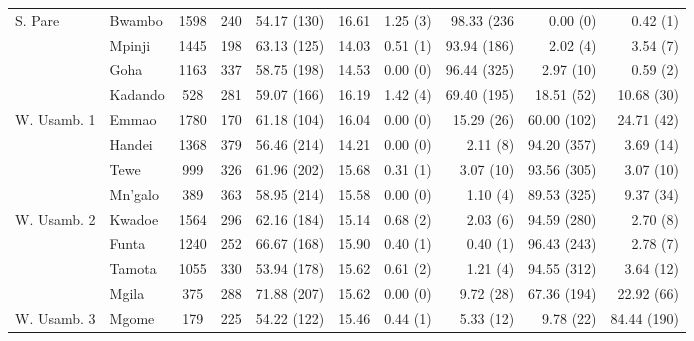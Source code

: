 \begin{tabular}{llccrcrrrr}
\cmidrule{2-10}
S. Pare                   &   Bwambo          &   1598   &   240   &   54.17 (130)   &   16.61   &   1.25 (3)   &   98.33 (236  &   0.00 (0)   &   0.42 (1)     \\
                          &   Mpinji          &   1445   &   198   &   63.13 (125)   &   14.03   &   0.51 (1)   &   93.94 (186) &   2.02 (4)    &   3.54 (7)     \\
                          &   Goha            &   1163   &   337   &   58.75 (198)   &   14.53   &   0.00 (0)   &   96.44 (325) &   2.97 (10)   &   0.59 (2)     \\
                          &   Kadando         &   528    &   281   &   59.07 (166)   &   16.19   &   1.42 (4)   &   69.40 (195) &   18.51 (52)  &   10.68 (30)   \\
\cmidrule{2-10}
W. Usamb. 1               &   Emmao           &   1780   &   170   &   61.18 (104)   &   16.04   &   0.00 (0)   &   15.29 (26)  &   60.00 (102) &   24.71 (42)   \\
                          &   Handei          &   1368   &   379   &   56.46 (214)   &   14.21   &   0.00 (0)   &   2.11 (8)    &   94.20 (357) &   3.69 (14)    \\
                          &   Tewe            &   999    &   326   &   61.96 (202)   &   15.68   &   0.31 (1)   &   3.07 (10)   &   93.56 (305) &   3.07 (10)    \\
                          &   Mn'galo         &   389    &   363   &   58.95 (214)   &   15.58   &   0.00 (0)   &   1.10 (4)    &   89.53 (325) &   9.37 (34)    \\
\cmidrule{2-10}
W. Usamb. 2               &   Kwadoe          &   1564   &   296   &   62.16 (184)   &   15.14   &   0.68 (2)   &   2.03 (6)    &   94.59 (280) &   2.70 (8)     \\
                          &   Funta           &   1240   &   252   &   66.67 (168)   &   15.90   &   0.40 (1)   &   0.40 (1)    &   96.43 (243) &   2.78 (7)     \\
                          &   Tamota          &   1055   &   330   &   53.94 (178)   &   15.62   &   0.61 (2)   &   1.21 (4)    &   94.55 (312) &   3.64 (12)    \\
                          &   Mgila           &   375    &   288   &   71.88 (207)   &   15.62   &   0.00 (0)   &   9.72 (28)   &   67.36 (194) &   22.92 (66)   \\
\cmidrule{2-10}
W. Usamb. 3               &   Mgome           &   179    &   225   &   54.22 (122)   &   15.46   &   0.44 (1)   &   5.33 (12)   &   9.78 (22)   &   84.44 (190)  \\
\bottomrule
\end{tabular}